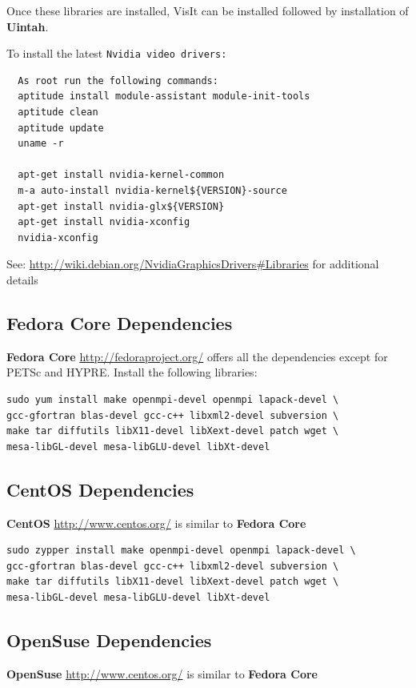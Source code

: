 \documentclass[12pt]{article}
\newcommand{\TT}[1]{\tt{#1} \normalfont}
\begin{document}
\noindent Once these libraries are installed, VisIt can be installed
followed by installation of \textbf{Uintah}.

\noindent To install the latest \TT{Nvidia}video drivers:
\begin{verbatim}
  As root run the following commands:
  aptitude install module-assistant module-init-tools
  aptitude clean
  aptitude update
  uname -r
  
  apt-get install nvidia-kernel-common
  m-a auto-install nvidia-kernel${VERSION}-source
  apt-get install nvidia-glx${VERSION}
  apt-get install nvidia-xconfig
  nvidia-xconfig
\end{verbatim}
See: \url{http://wiki.debian.org/NvidiaGraphicsDrivers#Libraries} for additional details

\subsection{Fedora Core  Dependencies}

\textbf{Fedora Core} \url{http://fedoraproject.org/} offers all the
dependencies except for PETSc and HYPRE.  Install the following
libraries:

\begin{verbatim}
sudo yum install make openmpi-devel openmpi lapack-devel \
gcc-gfortran blas-devel gcc-c++ libxml2-devel subversion \ 
make tar diffutils libX11-devel libXext-devel patch wget \
mesa-libGL-devel mesa-libGLU-devel libXt-devel 
\end{verbatim} 


\subsection{CentOS  Dependencies}

\textbf{CentOS} \url{http://www.centos.org/} is similar to \textbf{Fedora
Core} 

\begin{verbatim}
sudo zypper install make openmpi-devel openmpi lapack-devel \
gcc-gfortran blas-devel gcc-c++ libxml2-devel subversion \ 
make tar diffutils libX11-devel libXext-devel patch wget \
mesa-libGL-devel mesa-libGLU-devel libXt-devel 
\end{verbatim} 

\subsection{OpenSuse  Dependencies}

\textbf{OpenSuse} \url{http://www.centos.org/} is similar to
\textbf{Fedora Core}
\end{document}
